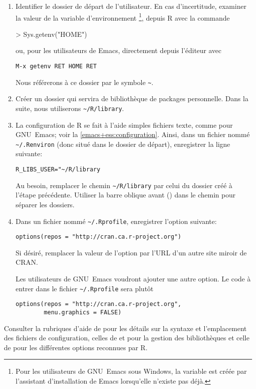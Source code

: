 \begin{enumerate}
\item Identifier le dossier de départ de l'utilisateur. En cas
  d'incertitude, examiner la valeur de la variable d'environnement
  \footnote{%
    Pour les utilisateurs de GNU~Emacs sous Windows, la variable est
    créée par l'assistant d'installation de Emacs lorsqu'elle n'existe
    pas déjà.}, %
  depuis R avec la commande
\begin{Schunk}
\begin{Sinput}
> Sys.getenv("HOME")
\end{Sinput}
\end{Schunk}
  ou, pour les utilisateurs de Emacs, directement depuis l'éditeur avec
\begin{verbatim}
M-x getenv RET HOME RET
\end{verbatim}
  Nous référerons à ce dossier par le symbole \verb=~=.
\item Créer un dossier qui servira de bibliothèque de packages
  personnelle. Dans la suite, nous utiliserons \verb=~/R/library=.
\item La configuration de R se fait à l'aide simples fichiers texte,
  comme pour GNU~Emacs; voir la \autoref{emacs+ess:configuration}.
  Ainsi, dans un fichier nommé \verb=~/.Renviron= (donc situé dans le
  dossier de départ), enregistrer la ligne suivante:
\begin{verbatim}
R_LIBS_USER="~/R/library
\end{verbatim}
  Au besoin, remplacer le chemin \verb=~/R/library= par celui du
  dossier créé à l'étape précédente. Utiliser la barre oblique avant
  (\code{/}) dans le chemin pour séparer les dossiers.
\item Dans un fichier nommé \verb=~/.Rprofile=, enregistrer l'option
  suivante:
\begin{verbatim}
options(repos = "http://cran.ca.r-project.org")
\end{verbatim}
  Si désiré, remplacer la valeur de l'option  par l'URL
  d'un autre site miroir de CRAN.

  Les utilisateurs de GNU~Emacs voudront ajouter une autre option. Le
  code à entrer dans le fichier \verb=~/.Rprofile= sera plutôt
\begin{verbatim}
options(repos = "http://cran.ca.r-project.org",
        menu.graphics = FALSE)
\end{verbatim}
\end{enumerate}
Consulter la rubriques d'aide de  pour les détails sur
la syntaxe et l'emplacement des fichiers de configuration, celles de
 et  pour la gestion des bibliothèques
et celle de  pour les différentes options reconnues par
R.


